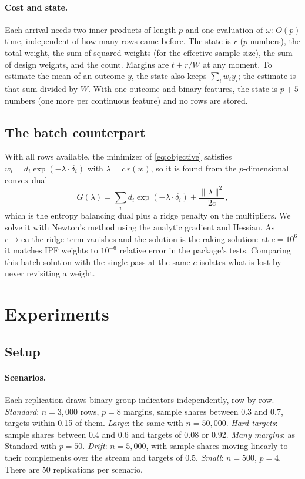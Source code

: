 \documentclass[12pt, letterpaper]{article}
\begin{document}
\paragraph{Cost and state.} Each arrival needs two inner products of length $p$ and one evaluation of $\omega$: $O(p)$ time, independent of how many rows came before. The state is $r$ ($p$ numbers), the total weight, the sum of squared weights (for the effective sample size), the sum of design weights, and the count. Margins are $t + r/W$ at any moment. To estimate the mean of an outcome $y$, the state also keeps $\sum_i w_i y_i$; the estimate is that sum divided by $W$. With one outcome and binary features, the state is $p+5$ numbers (one more per continuous feature) and no rows are stored.

\subsection{The batch counterpart}
\label{sec:batch}

With all rows available, the minimizer of \eqref{eq:objective} satisfies $w_i = d_i \exp(-\lambda \cdot \delta_i)$ with $\lambda = c\,r(w)$, so it is found from the $p$-dimensional convex dual
\[
  G(\lambda) = \sum_i d_i \exp(-\lambda \cdot \delta_i) + \frac{\lVert \lambda \rVert^2}{2c},
\]
which is the entropy balancing dual plus a ridge penalty on the multipliers. We solve it with Newton's method using the analytic gradient and Hessian. As $c \to \infty$ the ridge term vanishes and the solution is the raking solution: at $c = 10^6$ it matches IPF weights to $10^{-6}$ relative error in the package's tests. Comparing this batch solution with the single pass at the same $c$ isolates what is lost by never revisiting a weight.

\section{Experiments}
\label{sec:experiments}

\subsection{Setup}

\paragraph{Scenarios.} Each replication draws binary group indicators independently, row by row. \emph{Standard}: $n = 3{,}000$ rows, $p = 8$ margins, sample shares between 0.3 and 0.7, targets within 0.15 of them. \emph{Large}: the same with $n = 50{,}000$. \emph{Hard targets}: sample shares between 0.4 and 0.6 and targets of 0.08 or 0.92. \emph{Many margins}: as Standard with $p = 50$. \emph{Drift}: $n = 5{,}000$, with sample shares moving linearly to their complements over the stream and targets of 0.5. \emph{Small}: $n = 500$, $p = 4$. There are 50 replications per scenario.
\end{document}
